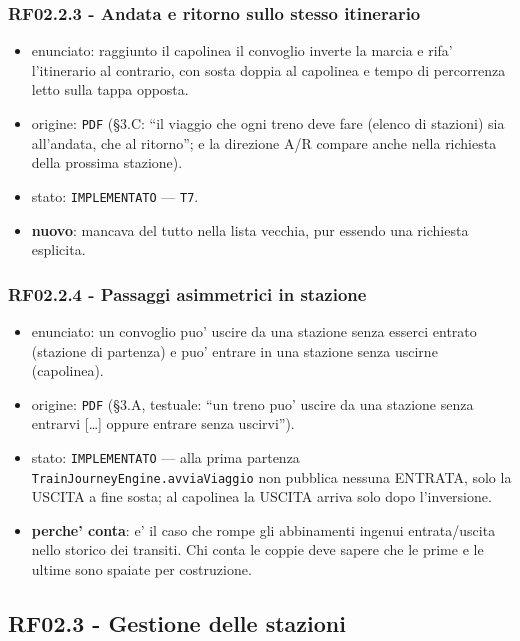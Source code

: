 \documentclass[11pt]{article}
\begin{document}
\subsubsection{RF02.2.3 - Andata e ritorno sullo stesso itinerario}
\label{sec:org8668a7e}
\begin{itemize}
\item enunciato: raggiunto il capolinea il convoglio inverte la marcia e rifa' l'itinerario al
contrario, con sosta doppia al capolinea e tempo di percorrenza letto sulla tappa opposta.
\item origine: \texttt{PDF} (§3.C: ``il viaggio che ogni treno deve fare (elenco di stazioni) sia all'andata,
che al ritorno''; e la direzione A/R compare anche nella richiesta della prossima stazione).
\item stato: \texttt{IMPLEMENTATO} — \texttt{T7}.
\item \textbf{nuovo}: mancava del tutto nella lista vecchia, pur essendo una richiesta esplicita.
\end{itemize}
\subsubsection{RF02.2.4 - Passaggi asimmetrici in stazione}
\label{sec:orgd2f0a64}
\begin{itemize}
\item enunciato: un convoglio puo' uscire da una stazione senza esserci entrato (stazione di partenza) e
puo' entrare in una stazione senza uscirne (capolinea).
\item origine: \texttt{PDF} (§3.A, testuale: ``un treno puo' uscire da una stazione senza entrarvi [\ldots{}] oppure
entrare senza uscirvi'').
\item stato: \texttt{IMPLEMENTATO} — alla prima partenza \texttt{TrainJourneyEngine.avviaViaggio} non pubblica nessuna
ENTRATA, solo la USCITA a fine sosta; al capolinea la USCITA arriva solo dopo l'inversione.
\item \textbf{perche' conta}: e' il caso che rompe gli abbinamenti ingenui entrata/uscita nello storico dei
transiti. Chi conta le coppie deve sapere che le prime e le ultime sono spaiate per costruzione.
\end{itemize}
\subsection{RF02.3 - Gestione delle stazioni}
\label{sec:org66ec225}
\end{document}
